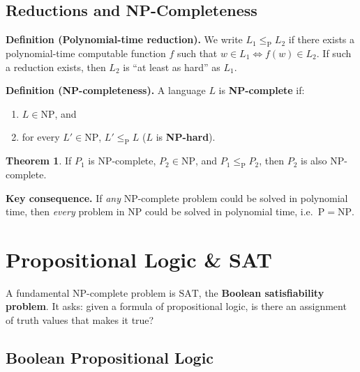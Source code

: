 \documentclass[11pt, a4paper]{article}
\theoremstyle{definition}
\newtheorem{theorem}{Theorem}[section]
\theoremstyle{remark}
\begin{document}
\subsection{Reductions and NP-Completeness}

\begin{defbox}
\textbf{Definition (Polynomial-time reduction).}
We write $L_1\leq_{\mathrm{P}} L_2$ if there exists a polynomial-time computable function
$f$ such that $w\in L_1\iff f(w)\in L_2$.  If such a reduction exists, then $L_2$ is
``at least as hard'' as $L_1$.
\end{defbox}

\begin{defbox}
\textbf{Definition (NP-completeness).}
A language $L$ is \textbf{NP-complete} if:
\begin{enumerate}
  \item $L\in\mathrm{NP}$, and
  \item for every $L'\in\mathrm{NP}$, $L'\leq_{\mathrm{P}} L$ \;($L$ is \textbf{NP-hard}).
\end{enumerate}
\end{defbox}

\begin{theorem}
If $P_1$ is NP-complete, $P_2\in\mathrm{NP}$, and $P_1\leq_{\mathrm{P}} P_2$, then $P_2$
is also NP-complete.
\end{theorem}

\begin{insightbox}
\textbf{Key consequence.}  If \emph{any} NP-complete problem could be solved in polynomial
time, then \emph{every} problem in NP could be solved in polynomial time, i.e.\
$\mathrm{P}=\mathrm{NP}$.
\end{insightbox}

\section{Propositional Logic \& SAT}

A fundamental NP-complete problem is $\mathrm{SAT}$, the \textbf{Boolean satisfiability
problem}.  It asks: given a formula of propositional logic, is there an assignment of truth
values that makes it true?

\subsection{Boolean Propositional Logic}
\end{document}
